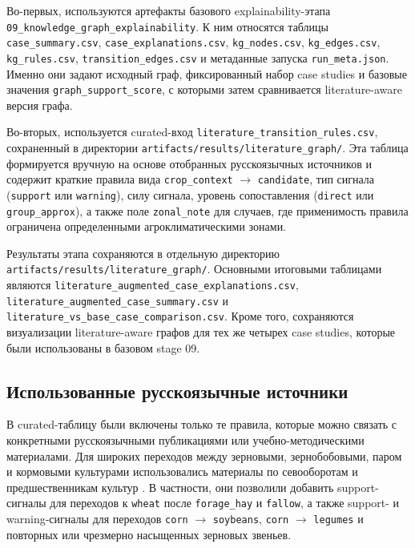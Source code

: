 Во-первых, используются артефакты базового explainability-этапа \texttt{09\_knowledge\_graph\_explainability}. К ним относятся таблицы \texttt{case\_summary.csv}, \texttt{case\_explanations.csv}, \texttt{kg\_nodes.csv}, \texttt{kg\_edges.csv}, \texttt{kg\_rules.csv}, \texttt{transition\_edges.csv} и метаданные запуска \texttt{run\_meta.json}. Именно они задают исходный граф, фиксированный набор case studies и базовые значения \texttt{graph\_support\_score}, с которыми затем сравнивается literature-aware версия графа.

Во-вторых, используется curated-вход \texttt{literature\_transition\_rules.csv}, сохраненный в директории \texttt{artifacts/results/literature\_graph/}. Эта таблица формируется вручную на основе отобранных русскоязычных источников и содержит краткие правила вида \texttt{crop\_context} $\rightarrow$ \texttt{candidate}, тип сигнала (\texttt{support} или \texttt{warning}), силу сигнала, уровень сопоставления (\texttt{direct} или \texttt{group\_approx}), а также поле \texttt{zonal\_note} для случаев, где применимость правила ограничена определенными агроклиматическими зонами.

Результаты этапа сохраняются в отдельную директорию \texttt{artifacts/results/literature\_graph/}. Основными итоговыми таблицами являются \texttt{literature\_augmented\_case\_explanations.csv}, \texttt{literature\_augmented\_case\_summary.csv} и \texttt{literature\_vs\_base\_case\_comparison.csv}. Кроме того, сохраняются визуализации literature-aware графов для тех же четырех case studies, которые были использованы в базовом stage 09.

\subsection{Использованные русскоязычные источники}

В curated-таблицу были включены только те правила, которые можно связать с конкретными русскоязычными публикациями или учебно-методическими материалами. Для широких переходов между зерновыми, зернобобовыми, паром и кормовыми культурами использовались материалы по севооборотам и предшественникам культур \cite{stgau-rotation-basics,wheat-predecessor-study,kubsau-soy-predecessors}. В частности, они позволили добавить support-сигналы для переходов к \texttt{wheat} после \texttt{forage\_hay} и \texttt{fallow}, а также support- и warning-сигналы для переходов \texttt{corn} $\rightarrow$ \texttt{soybeans}, \texttt{corn} $\rightarrow$ \texttt{legumes} и повторных или чрезмерно насыщенных зерновых звеньев.

